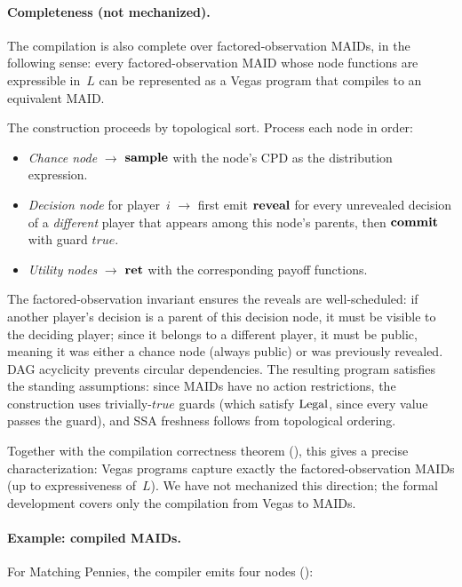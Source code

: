 \documentclass[11pt]{article}
\begin{document}
\paragraph{Completeness (not mechanized).}
The compilation is also complete over factored-observation MAIDs, in the
following sense: every factored-observation MAID whose node functions are
expressible in~$L$ can be represented as a Vegas program that compiles to an
equivalent MAID.

The construction proceeds by topological sort. Process each node in order:
\begin{itemize}[nosep]
\item \emph{Chance node} $\to$ $\mathbf{sample}$ with the node's CPD as the
      distribution expression.
\item \emph{Decision node} for player~$i$ $\to$ first emit $\mathbf{reveal}$ for every
      unrevealed decision of a \emph{different} player that appears among this
      node's parents, then $\mathbf{commit}$ with guard $\mathit{true}$.
\item \emph{Utility nodes} $\to$ $\mathbf{ret}$ with the corresponding payoff functions.
\end{itemize}
The factored-observation invariant ensures the reveals are well-scheduled:
if another player's decision is a parent of this decision node, it must be
visible to the deciding player; since it belongs to a different player, it
must be public, meaning it was either a chance node (always public) or was
previously revealed. DAG acyclicity prevents circular dependencies. The
resulting program satisfies the standing assumptions: since MAIDs have no
action restrictions, the construction uses trivially-$\mathit{true}$ guards
(which satisfy $\mathrm{Legal}$, since every value passes the guard), and SSA
freshness follows from topological ordering.

Together with the compilation correctness theorem (),
this gives a precise characterization: Vegas programs capture exactly the
factored-observation MAIDs (up to expressiveness of~$L$). We have not
mechanized this direction; the formal development covers only the
compilation from Vegas to MAIDs.

\paragraph{Example: compiled MAIDs.}
For Matching Pennies, the compiler emits four nodes
():
\end{document}
